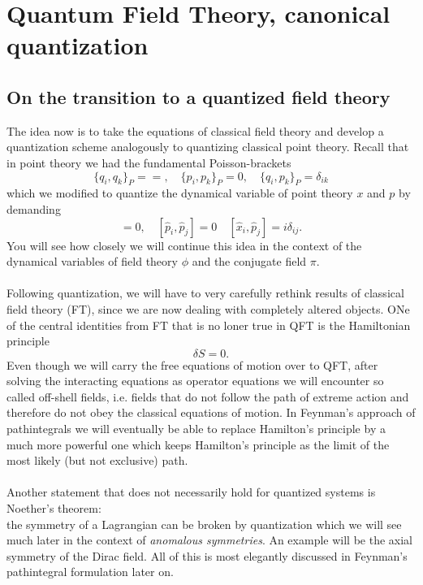 
\chapter{Quantum Field Theory, canonical quantization}



\section{On the transition to a quantized field theory}
The idea now is to take the equations of classical field theory and develop a quantization scheme analogously to quantizing classical point theory. Recall that in point theory we had the fundamental Poisson-brackets
\begin{equation}
	\{q_i,q_k\}_P==, \quad \{p_i,p_k\}_P=0,\quad \{q_i,p_k\}_P=\delta_{ik}
\end{equation}
which we modified to quantize the dynamical variable of point theory $x$ and $p$ by demanding
\begin{equation}
	[\hat{ x}_i,\hat{ x}_j]=0,\quad [\hat{p}_i,\hat{p}_j]=0\quad [\hat{ x}_i,\hat{p}_j]=i\delta_{ij}.
\end{equation}
You will see how closely we will continue this idea in the context of the dynamical variables of field theory $\phi$ and the conjugate field $\pi$.\\
\\
Following quantization, we will have to very carefully rethink results of classical field theory (FT), since we are now dealing with completely altered objects. ONe of the central identities from FT that is no loner true in QFT is the Hamiltonian principle
\begin{equation}
	\delta S=0.
\end{equation}
Even though we will carry the free equations of motion over to QFT, after solving the interacting equations as operator equations we will encounter so called off-shell fields, i.e. fields that do not follow the path of extreme action and therefore do not obey the classical equations of motion. In Feynman's approach of pathintegrals we will eventually be able to replace Hamilton's principle by a much more powerful one which keeps Hamilton's principle as the limit of the most likely (but not exclusive) path.\\
\\
Another statement that does not necessarily hold for quantized systems is Noether's theorem: \\
the symmetry of a Lagrangian can be broken by quantization which we will see much later in the context of \emph{anomalous symmetries}. An example will be the axial symmetry of the Dirac field. All of this is most elegantly discussed in Feynman's pathintegral formulation later on.
